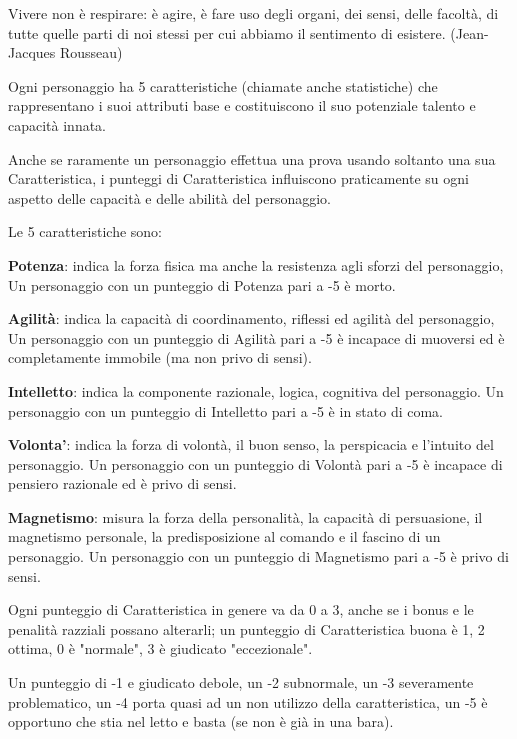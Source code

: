 \documentclass[a4paper,11pt,twoside,openany]{book}
\begin{document}
\label{le-caratteristiche}

\begin{tcolorbox}[enhanced,arc=5pt,boxrule=0.3pt]{Vivere non è respirare: è agire, è fare uso degli organi, dei sensi, delle facoltà, di tutte quelle parti di noi stessi per cui abbiamo il sentimento di esistere. (Jean-Jacques Rousseau)}\end{tcolorbox}\medskip

Ogni personaggio ha 5 caratteristiche (chiamate anche statistiche) che rappresentano i suoi attributi base e costituiscono il suo potenziale talento e capacità innata.

Anche se raramente un personaggio effettua una prova usando soltanto una sua Caratteristica, i punteggi di Caratteristica influiscono praticamente su ogni aspetto delle capacità e delle abilità del personaggio.

Le 5 caratteristiche sono:

\textbf{Potenza}: indica la forza fisica ma anche la resistenza agli sforzi del personaggio, Un personaggio con un punteggio di Potenza pari a -5 è morto.

\textbf{Agilità}: indica la capacità di coordinamento, riflessi ed agilità del personaggio, Un personaggio con un punteggio di Agilità pari a -5 è incapace di muoversi ed è completamente immobile (ma non privo di sensi).

\textbf{Intelletto}: indica la componente razionale, logica, cognitiva del personaggio. Un personaggio con un punteggio di Intelletto pari a -5 è in stato di coma.

\textbf{Volonta'}: indica la forza di volontà, il buon senso, la perspicacia e l'intuito del personaggio. Un personaggio con un punteggio di Volontà pari a -5 è incapace di pensiero razionale ed è privo di sensi.

\textbf{Magnetismo}: misura la forza della personalità, la capacità di persuasione, il magnetismo personale, la predisposizione al comando e il fascino di un personaggio. Un personaggio con un punteggio di Magnetismo pari a -5 è privo di sensi.

\smallskip

Ogni punteggio di Caratteristica in genere va da 0 a 3, anche se i bonus e le penalità razziali possano alterarli; un punteggio di Caratteristica buona è 1, 2 ottima, 0 è "normale", 3 è giudicato "eccezionale".

Un punteggio di -1 e giudicato debole, un -2 subnormale, un -3 severamente problematico, un -4 porta quasi ad un non utilizzo della caratteristica, un -5 è opportuno che stia nel letto e basta (se non è già in una bara).
\end{document}
